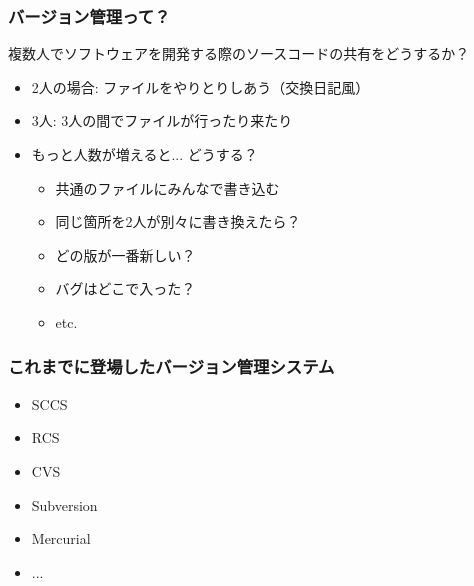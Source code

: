 \documentclass[dvipdfmx]{beamer}
\begin{document}
\begin{frame}
    \frametitle{バージョン管理って？}
    複数人でソフトウェアを開発する際のソースコードの共有をどうするか？

    \begin{itemize}
        \item<1-> 2人の場合: ファイルをやりとりしあう（交換日記風）
        \item<2-> 3人: 3人の間でファイルが行ったり来たり
        \item<3-> もっと人数が増えると... どうする？
        \begin{itemize}
            \item<4-> 共通のファイルにみんなで書き込む
            \item<5-> 同じ箇所を2人が別々に書き換えたら？
            \item<6-> どの版が一番新しい？
            \item<7-> バグはどこで入った？
            \item<8-> etc.
        \end{itemize}
    \end{itemize}{}

\end{frame}

\begin{frame}
    \frametitle{これまでに登場したバージョン管理システム}
    \large
    \begin{itemize}
        \item SCCS
        \item RCS
        \item CVS
        \item Subversion
        \item Mercurial
        \item ...
    \end{itemize}
\end{frame}
\end{document}
